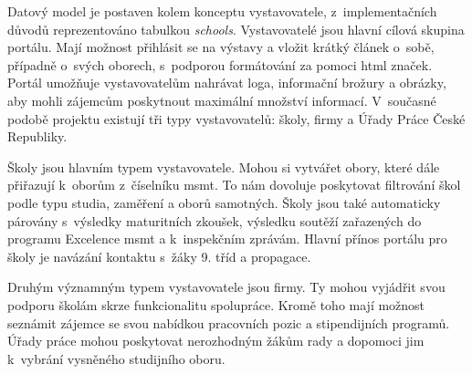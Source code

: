 Datový model \bso je postaven kolem konceptu vystavovatele, z~implementačních důvodů reprezentováno tabulkou \emph{schools}. Vystavovatelé jsou hlavní cílová skupina portálu. Mají možnost přihlásit se na výstavy a vložit krátký článek o~sobě, případně o~svých oborech, s~podporou formátování za pomoci \acrshort{html} značek. Portál umožňuje vystavovatelům nahrávat loga, informační brožury a obrázky, aby mohli zájemcům poskytnout maximální množství informací. V~současné podobě projektu \bso existují tři typy vystavovatelů: školy, firmy a Úřady Práce České Republiky. 

Školy jsou hlavním typem vystavovatele. Mohou si vytvářet obory, které dále přiřazují k~oborům z~číselníku \acrshort{msmt}. To nám dovoluje poskytovat filtrování škol podle typu studia, zaměření a oborů samotných. Školy jsou také automaticky párovány s~výsledky maturitních zkoušek, výsledku soutěží zařazených do programu Excelence \acrshort{msmt} a k~inspekčním zprávám. Hlavní přínos portálu \bso pro školy je navázání kontaktu s~žáky 9. tříd a propagace. 

Druhým významným typem vystavovatele jsou firmy. Ty mohou vyjádřit svou podporu školám skrze funkcionalitu spolupráce. Kromě toho mají možnost seznámit zájemce se svou nabídkou pracovních pozic a stipendijních programů. Úřady práce mohou poskytovat nerozhodným žákům rady a dopomoci jim k~vybrání vysněného studijního oboru.